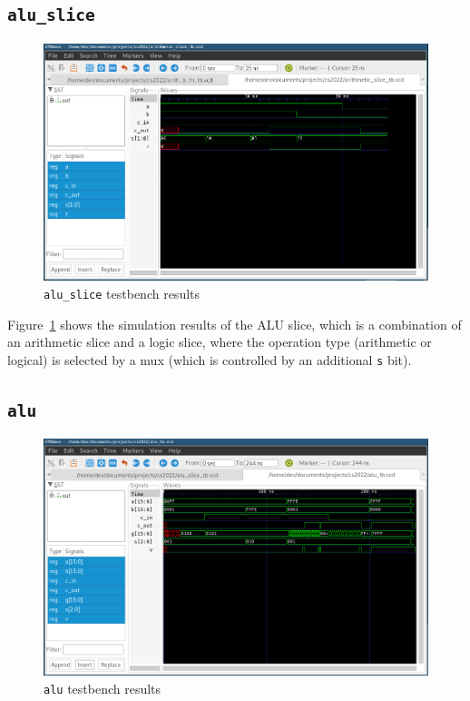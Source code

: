 \documentclass[a4paper]{article}
\numberwithin{figure}{section}
\numberwithin{table}{section}
\newcommand{\mi}{\mintinline}
\begin{document}
\subsection{\mi{c}{alu_slice}}
\begin{figure}[h!]
	\centering
	\includegraphics[width=\textwidth]{arithmetic_slice_tb}
	\caption{\mi{c}{alu_slice} testbench results}
	\label{fig:aluslice}
\end{figure}

Figure~\ref{fig:aluslice} shows the simulation results of the ALU slice, which is a 
combination of an arithmetic slice and a logic slice, where the operation type (arithmetic or 
logical) is selected by a mux (which is controlled by an additional \mi{c}{s} bit).

\newpage
\subsection{\mi{c}{alu}}
\begin{figure}[h!]
	\centering
	\includegraphics[width=\textwidth]{alu_tb}
	\caption{\mi{c}{alu} testbench results}
	\label{fig:alu}
\end{figure}
\end{document}

